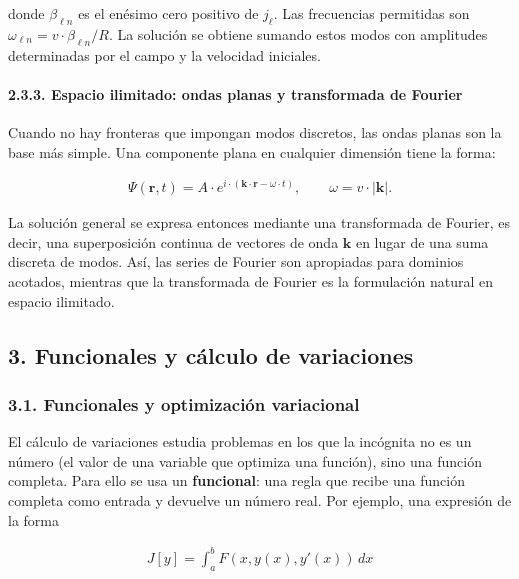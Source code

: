 \documentclass[
  spanish,
]{article}
\begin{document}
donde \(\beta_{\ell n}\) es el enésimo cero positivo de \(j_\ell\). Las
frecuencias permitidas son \(\omega_{\ell n}=v \cdot \beta_{\ell n}/R\).
La solución se obtiene sumando estos modos con amplitudes determinadas
por el campo y la velocidad iniciales.

\paragraph{2.3.3. Espacio ilimitado: ondas planas y transformada de
Fourier}\label{espacio-ilimitado-ondas-planas-y-transformada-de-fourier}

Cuando no hay fronteras que impongan modos discretos, las ondas planas
son la base más simple. Una componente plana en cualquier dimensión
tiene la forma:

\[
\begin{aligned}
\Psi(\mathbf{r},t)
= A \cdot e^{i \cdot (\mathbf{k} \cdot \mathbf{r}-\omega \cdot t)},
\qquad \omega = v \cdot |\mathbf{k}|.
\end{aligned}
\]

La solución general se expresa entonces mediante una transformada de
Fourier, es decir, una superposición continua de vectores de onda
\(\mathbf{k}\) en lugar de una suma discreta de modos. Así, las series
de Fourier son apropiadas para dominios acotados, mientras que la
transformada de Fourier es la formulación natural en espacio ilimitado.

\subsection{3. Funcionales y cálculo de
variaciones}\label{funcionales-y-cuxe1lculo-de-variaciones}

\subsubsection{3.1. Funcionales y optimización
variacional}\label{funcionales-y-optimizaciuxf3n-variacional}

El cálculo de variaciones estudia problemas en los que la incógnita no
es un número (el valor de una variable que optimiza una función), sino
una función completa. Para ello se usa un \textbf{funcional}: una regla
que recibe una función completa como entrada y devuelve un número real.
Por ejemplo, una expresión de la forma

\[
\begin{aligned}
J[y] = \int_a^b F(x, y(x), y'(x)) \, dx
\end{aligned}
\]
\end{document}
